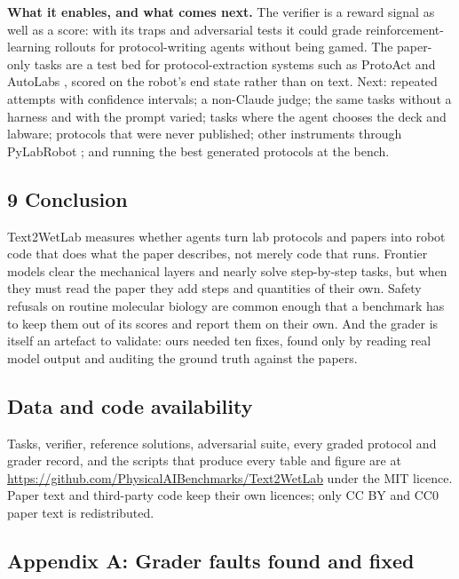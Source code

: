 \documentclass[
]{article}
\begin{document}
\textbf{What it enables, and what comes next.} The verifier is a reward
signal as well as a score: with its traps and adversarial tests it could
grade reinforcement-learning rollouts for protocol-writing agents
without being gamed. The paper-only tasks are a test bed for
protocol-extraction systems such as ProtoAct \citep{liu2026protoact} and
AutoLabs \citep{panapitiya2026autolabs}, scored on the robot's end state
rather than on text. Next: repeated attempts with confidence intervals;
a non-Claude judge; the same tasks without a harness and with the prompt
varied; tasks where the agent chooses the deck and labware; protocols
that were never published; other instruments through PyLabRobot
\citep{wierenga2023pylabrobot}; and running the best generated protocols
at the bench.

\subsection{9 Conclusion}\label{conclusion}

Text2WetLab measures whether agents turn lab protocols and papers into
robot code that does what the paper describes, not merely code that
runs. Frontier models clear the mechanical layers and nearly solve
step-by-step tasks, but when they must read the paper they add steps and
quantities of their own. Safety refusals on routine molecular biology
are common enough that a benchmark has to keep them out of its scores
and report them on their own. And the grader is itself an artefact to
validate: ours needed ten fixes, found only by reading real model output
and auditing the ground truth against the papers.

\subsection{Data and code
availability}\label{data-and-code-availability}

Tasks, verifier, reference solutions, adversarial suite, every graded
protocol and grader record, and the scripts that produce every table and
figure are at \url{https://github.com/PhysicalAIBenchmarks/Text2WetLab}
under the MIT licence. Paper text and third-party code keep their own
licences; only CC BY and CC0 paper text is redistributed.

\subsection{Appendix A: Grader faults found and
fixed}\label{appendix-a-grader-faults-found-and-fixed}
\end{document}
